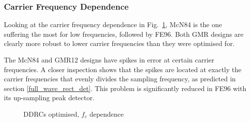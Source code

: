 \documentclass[../main2.tex]{subfiles}
\providecommand{\rootdir}{..}
\begin{document}
\subsubsection{Carrier Frequency Dependence}
Looking at the carrier frequency dependence in Fig.~\ref{fig:complete_DDRC_opt_fc_dep}, McN84 is the one suffering the most for low frequencies, followed by FE96. Both GMR designs are clearly more robust to lower carrier frequencies than they were optimised for.

The McN84 and GMR12 designs have spikes in error at certain carrier frequencies. A closer inspection shows that the spikes are located at exactly the carrier frequencies that evenly divides the sampling frequency, as predicted in section \ref{full_wave_rect_det}. This problem is significantly reduced in FE96 with its up-sampling peak detector.

\begin{figure}[h]
\centerline{}
\caption{DDRCs optimised, $f_c$ dependence}
\label{fig:complete_DDRC_opt_fc_dep}
\end{figure}
\end{document}
